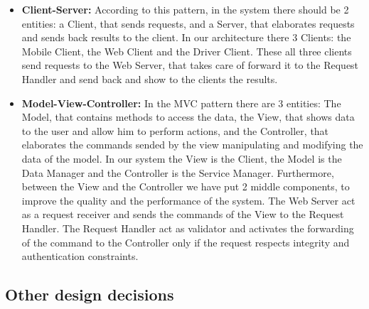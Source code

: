 \begin{itemize}
\item {\textbf{Client-Server:}} According to this pattern, in the system there should be 2 entities: a Client, that sends requests, and a Server, that elaborates requests and sends back results to the client. In our architecture there 3 Clients: the Mobile Client, the Web Client and the Driver Client. These all three  clients send requests to the Web Server, that takes care of forward it to the Request Handler and send back and show to the clients the results.


\item{\textbf{Model-View-Controller:}} In the MVC pattern there are 3 entities: The Model, that contains methods to access the data, the View, that shows data to the user and allow him to perform actions, and the Controller, that elaborates the commands sended by the view manipulating and modifying  the data of the model.
In our system the View is the Client, the Model is the Data Manager and the Controller is the Service Manager. Furthermore, between the View and the Controller we have put 2 middle components, to improve the quality and the performance of the system. The Web Server act as a request receiver and sends the commands of the View to the Request Handler. The Request Handler act as validator and activates the forwarding of the command to the Controller only if the request respects integrity and authentication constraints.
\end{itemize}



\subsection{Other design decisions }